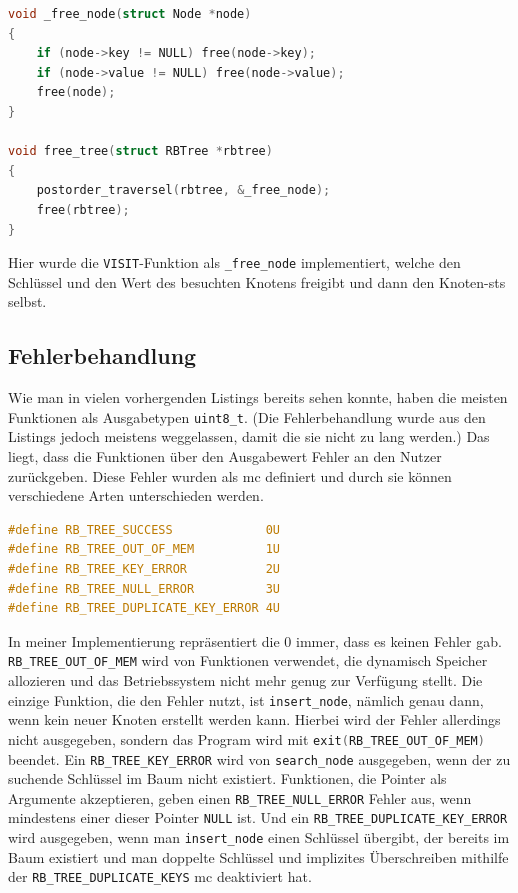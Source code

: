 \documentclass[11pt]{article}
\newcommand{\lstin}[1]{\lstinline[language=C]{#1}}
\begin{document}
\begin{lstlisting}[language=C]
void _free_node(struct Node *node)
{
    if (node->key != NULL) free(node->key);
    if (node->value != NULL) free(node->value);
    free(node);
}

void free_tree(struct RBTree *rbtree)
{
    postorder_traversel(rbtree, &_free_node);
    free(rbtree);
}
\end{lstlisting}

Hier wurde die \lstin{VISIT}-Funktion als \lstin{_free_node} implementiert, welche den Schlüssel und den Wert des besuchten Knotens freigibt und dann den Knoten-\gls{sts} selbst.

\subsection{Fehlerbehandlung} \label{err}
Wie man in vielen vorhergenden Listings bereits sehen konnte, haben die meisten Funktionen als Ausgabetypen \lstin{uint8_t}. (Die Fehlerbehandlung wurde aus den Listings jedoch meistens weggelassen, damit die sie nicht zu lang werden.)
Das liegt, dass die Funktionen über den Ausgabewert Fehler an den Nutzer zurückgeben. Diese Fehler wurden als \gls{mc} definiert und durch sie können verschiedene Arten unterschieden werden.

\begin{lstlisting}[language=C]
#define RB_TREE_SUCCESS             0U
#define RB_TREE_OUT_OF_MEM          1U
#define RB_TREE_KEY_ERROR           2U
#define RB_TREE_NULL_ERROR          3U
#define RB_TREE_DUPLICATE_KEY_ERROR 4U
\end{lstlisting}

In meiner Implementierung repräsentiert die 0 immer, dass es keinen Fehler gab.
\lstin{RB_TREE_OUT_OF_MEM} wird von Funktionen verwendet, die dynamisch Speicher allozieren und das Betriebssystem nicht mehr genug zur Verfügung stellt.
Die einzige Funktion, die den Fehler nutzt, ist \lstin{insert_node}, nämlich genau dann, wenn kein neuer Knoten erstellt werden kann.
Hierbei wird der Fehler allerdings nicht ausgegeben, sondern das Program wird mit \lstin{exit(RB_TREE_OUT_OF_MEM)} beendet.
Ein \lstin{RB_TREE_KEY_ERROR} wird von \lstin{search_node} ausgegeben, wenn der zu suchende Schlüssel im Baum nicht existiert.
Funktionen, die Pointer als Argumente akzeptieren, geben einen \lstin{RB_TREE_NULL_ERROR} Fehler aus, wenn mindestens einer dieser Pointer \lstin{NULL} ist.
Und ein \lstin{RB_TREE_DUPLICATE_KEY_ERROR} wird ausgegeben, wenn man \lstin{insert_node} einen Schlüssel übergibt, der bereits im Baum existiert und man doppelte Schlüssel und implizites Überschreiben mithilfe der \lstin{RB_TREE_DUPLICATE_KEYS} \gls{mc} deaktiviert hat.
\end{document}
